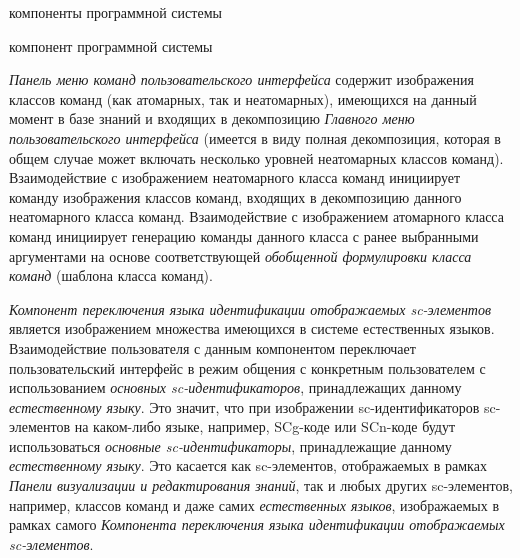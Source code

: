 \begin{SCn}
\begin{scnrelfromlist}{компоненты программной системы}
    \begin{scnindent}
        \begin{scnrelfromlist}{компонент программной системы}
        \end{scnrelfromlist}
    \end{scnindent}
\end{scnrelfromlist}
\end{SCn}

\textit{Панель меню команд пользовательского интерфейса} содержит изображения классов команд (как атомарных, так и
неатомарных), имеющихся на данный момент в базе знаний и входящих в декомпозицию \textit{Главного меню пользовательского
интерфейса} (имеется в виду полная декомпозиция, которая в общем случае может включать несколько уровней неатомарных
классов команд). Взаимодействие с изображением неатомарного класса команд инициирует команду изображения классов
команд, входящих в декомпозицию данного неатомарного класса команд. Взаимодействие с изображением атомарного класса
команд инициирует генерацию команды данного класса с ранее выбранными аргументами на основе соответствующей
\textit{обобщенной формулировки класса команд} (шаблона класса команд).

\textit{Компонент переключения языка идентификации отображаемых sc-элементов} является изображением множества
имеющихся в системе естественных языков. Взаимодействие пользователя с данным компонентом переключает
пользовательский интерфейс в режим общения с конкретным пользователем с использованием \textit{основных sc-идентификаторов},
принадлежащих данному \textit{естественному языку}. Это значит, что при изображении sc-идентификаторов sc-элементов
на каком-либо языке, например, SCg-коде или SCn-коде будут использоваться \textit{основные sc-идентификаторы},
принадлежащие данному \textit{естественному языку}. Это касается как sc-элементов, отображаемых в рамках
\textit{Панели визуализации и редактирования знаний}, так и любых других sc-элементов, например, классов команд и
даже самих \textit{естественных языков}, изображаемых в рамках самого \textit{Компонента переключения языка идентификации
отображаемых sc-элементов}.

